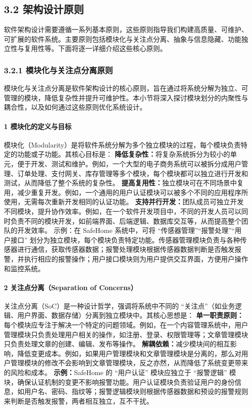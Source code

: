 \subsection{3.2 架构设计原则}\label{ux67b6ux6784ux8bbeux8ba1ux539fux5219} 软件架构设计需要遵循一系列基本原则，这些原则指导我们构建高质量、可维护、可扩展的软件系统。主要原则包括模块化与关注点分离、抽象与信息隐藏、功能独立性与复用性等。下面将逐一详细介绍这些核心原则。 \subsubsection{3.2.1 模块化与关注点分离原则}\label{ux6a21ux5757ux5316ux4e0eux5173ux6ce8ux70b9ux5206ux79bbux539fux5219} 模块化与关注点分离是软件架构设计的核心原则，旨在通过将系统分解为独立、可管理的模块，降低复杂性并提升可维护性。本小节将深入探讨模块划分的内聚性与耦合性，以及如何通过这些原则优化系统设计。 \paragraph{1 模块化的定义与目标}\label{ux6a21ux5757ux5316ux7684ux5b9aux4e49ux4e0eux76eeux6807} 模块化（Modularity）是将软件系统分解为多个独立模块的过程，每个模块负责特定的功能或子功能。其核心目标是： \textbf{降低复杂性：}将复杂系统拆分为较小的单元，便于开发、测试和维护。例如，一个大型的电子商务系统可以被拆分成用户管理、订单处理、支付网关、库存管理等多个模块，每个模块都可以独立进行开发和测试，从而降低了整个系统的复杂性。 \textbf{提高复用性：}独立模块可在不同场景中复用，减少重复开发。例如，一个通用的用户认证模块可以被多个不同的应用程序所使用，无需每次重新开发相同的认证功能。 \textbf{支持并行开发：}团队成员可独立开发不同模块，提升协作效率。例如，在一个软件开发项目中，不同的开发人员可以同时负责不同的模块开发，如前端界面、后端逻辑、数据库交互等，从而提高整个团队的开发效率。 示例：在 SafeHome 系统中，可将 ``传感器管理''``报警处理''``用户接口'' 划分为独立模块，每个模块负责特定功能。传感器管理模块负责与各种传感器进行通信，获取传感器数据；报警处理模块根据传感器数据判断是否触发报警，并执行相应的报警操作；用户接口模块则为用户提供交互界面，方便用户操作和监控系统。 \paragraph{2 关注点分离（Separation of Concerns）}\label{ux5173ux6ce8ux70b9ux5206ux79bbseparation-of-concerns} 关注点分离（SoC）是一种设计哲学，强调将系统中不同的 ``关注点''（如业务逻辑、用户界面、数据存储）分离到独立模块中。其核心思想是： \textbf{单一职责原则：}每个模块应专注于解决一个特定的问题领域。例如，在一个内容管理系统中，用户管理模块只负责处理用户相关的操作，如注册、登录、权限管理等；文章管理模块只负责处理文章的创建、编辑、发布等操作。 \textbf{解耦依赖：}减少模块间的相互影响，降低变更成本。例如，如果用户管理模块和文章管理模块是分离的，那么对用户管理模块的修改不会影响到文章管理模块，反之亦然，从而降低了系统变更带来的风险和成本。 \textbf{示例：}SafeHome 的 ``用户认证'' 模块应独立于 ``报警逻辑'' 模块，确保认证机制的变更不影响报警功能。用户认证模块负责验证用户的身份信息，如用户名、密码、指纹等；报警逻辑模块则根据传感器数据和预设的报警规则来判断是否触发报警，两者相互独立，互不干扰。 